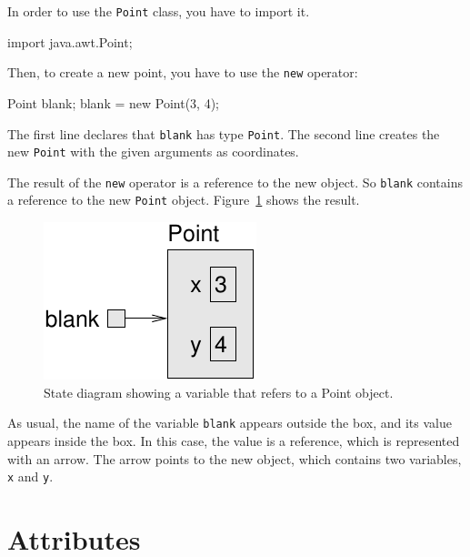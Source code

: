 \documentclass[12pt]{book}
\theoremstyle{exercise}
\newcommand{\java}[1]{\verb"#1"}
\begin{document}
In order to use the \java{Point} class, you have to import it.

\begin{code}
import java.awt.Point;
\end{code}

Then, to create a new point, you have to use the \java{new} operator:

\begin{code}
    Point blank;
    blank = new Point(3, 4);
\end{code}


The first line declares that \java{blank} has type \java{Point}.
The second line creates the new \java{Point} with the given arguments as coordinates.


The result of the \java{new} operator is a reference to the new object.
So \java{blank} contains a reference to the new \java{Point} object.
Figure~\ref{fig.reference} shows the result.

\begin{figure}
\begin{center}
\includegraphics{figs/reference.pdf}
\caption{State diagram showing a variable that refers to a Point object.}
\label{fig.reference}
\end{center}
\end{figure}


As usual, the name of the variable \java{blank} appears outside the box, and its value appears inside the box.
In this case, the value is a reference, which is represented with an arrow.
The arrow points to the new object, which contains two variables, \java{x} and \java{y}.


\section{Attributes}
\label{attribute}
\end{document}
